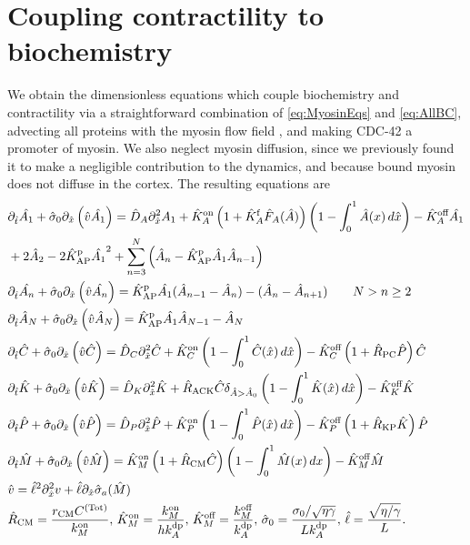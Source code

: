 \documentclass[11pt]{article}
\newcommand{\6}[1]{#1_{\text{6}}}
\newcommand{\3}[1]{#1_{\text{3}}}
\newcommand{\Tot}[1]{#1^\text{(Tot)}}
\newcommand{\My}[1]{#1_M}
\begin{document}
\section{Coupling contractility to biochemistry \label{sec:WithMy}}
We obtain the dimensionless equations which couple biochemistry and contractility via a straightforward combination of \eqref{eq:MyosinEqs} and \eqref{eq:AllBC}, advecting all proteins with the myosin flow field \cite{illukkumbura2023design}, and making CDC-42 a promoter of myosin. We also neglect myosin diffusion, since we previously found it to make a negligible contribution to the dynamics, and because bound myosin does not diffuse in the cortex. The resulting equations are 
\begin{subequations}
\label{eq:Everything}
\begin{align}
& \Dthat \hat{\MA} +\hat{\sigma}_0  \Dxhat \left(\hat{v} \hat{\MA} \right)  = \DhatA \Dxhat^2 \MA +\KhatonA \left(1+\KhatfA \hat F_A(\hat A) \right)\left(1 - \int_0^1 \hat A(x) \, d\hat{x} \right)- \KhatoffA \hat{\MA} \\ \nonumber
 &+ 2 \hat{A}_2-2\KhatpAP \hat{\MA}^2+\sum_{n=3}^N \left(\hat A_n-\KhatpAP \hat A_1 \hat A_{n-1}\right)  \\
&\Dthat \hat{\PA} +\hat{\sigma}_0  \Dxhat \left(\hat{v} \hat{\PA} \right) =\KhatpAP \hat{\MA} (\hat A_{n-1}-\hat A_n) - (\hat A_n-\hat A_{n+1})  \qquad N > n \geq 2 \\ 
& \Dthat \hat A_N +\hat{\sigma}_0  \Dxhat \left(\hat{v} \hat A_N \right)  =\KhatpAP \hat \MA \hat A_{N-1}- \hat A_N \\ 
&\Dthat \hat{C}+\hat{\sigma}_0  \Dxhat \left(\hat{v} \hat{C} \right)  =\DhatC \Dxhat^2 \hat{C} +\KhatonC \left(1 - \int_0^1 \hat{C}(\hat x) \, d\hat{x} \right)  - \KhatoffC \left(1+\hat{R}_\text{PC}\hat P\right)\hat{C}\\
&\Dthat \hat{K} +\hat{\sigma}_0  \Dxhat \left(\hat{v} \hat{K} \right) = \DhatK \Dxhat^2 \hat{K} + \hat{R}_\text{ACK} \hat{C} \delta_{\hat A > \hat A_0} \left(1 - \int_0^1 \hat{K}(\hat x) \, d\hat{x} \right)-\KhatoffK \hat{K} \\
&\Dthat \hat{P} +\hat{\sigma}_0  \Dxhat \left(\hat{v} \hat{P} \right)  =\DhatP \Dxhat^2 \hat{P} +\KhatonP \left(1 - \int_0^1 \hat{P}(\hat x) \, d\hat{x} \right)  - \KhatoffP \left(1+\hat{R}_\text{KP}\hat{K}\right)\hat{P}\\
\label{eq:MyInAll}
&\Dthat \hat{M} +\hat{\sigma}_0  \Dxhat \left(\hat{v} \hat{M} \right) =\KhatonM \left(1+\hat{R}_\text{CM} \hat C\right) \left(1-\int_0^1  \hat{M}(x) \, dx\right)- \KhatoffM \hat{M}\\
&\hat{v} = \hat{\ell}^2 \Dxhat^2 v +\hat{\ell} \Dxhat \hat{\sigma}_a(\hat{M})\\
\label{eq:NewNDs}
&\hat R_\text{CM}=\frac{r_\text{CM}\Tot{C}}{\kon_M},\, \hat{K}^\text{on}_M= \frac{\My{\kon}}{h \kdp_A}, \, \hat{K}^\text{off}_M= \frac{\My{\koff}}{\kdp_A},\, \hat{\sigma}_0 = \frac{\sigma_0/ \sqrt{\eta \gamma} }{L \kdp_A},   \, \hat{\ell} = \frac{\sqrt{\eta/\gamma}}{L}.
\end{align}
\end{subequations}
\end{document}
